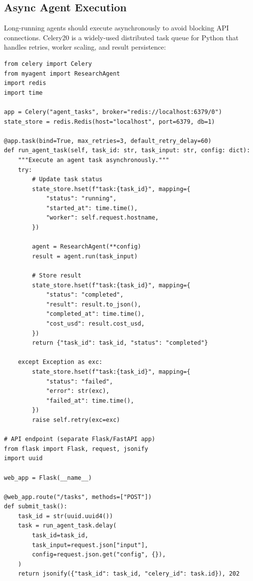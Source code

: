 \subsection{Async Agent Execution}
\label{async-agent-execution}

Long-running agents should execute asynchronously to avoid blocking API connections. Celery20 is a widely-used distributed task queue for Python that handles retries, worker scaling, and result persistence:

\begin{lstlisting}[style=pythonstyle, caption={Async agent execution with Celery}]
from celery import Celery
from myagent import ResearchAgent
import redis
import time

app = Celery("agent_tasks", broker="redis://localhost:6379/0")
state_store = redis.Redis(host="localhost", port=6379, db=1)

@app.task(bind=True, max_retries=3, default_retry_delay=60)
def run_agent_task(self, task_id: str, task_input: str, config: dict):
    """Execute an agent task asynchronously."""
    try:
        # Update task status
        state_store.hset(f"task:{task_id}", mapping={
            "status": "running",
            "started_at": time.time(),
            "worker": self.request.hostname,
        })

        agent = ResearchAgent(**config)
        result = agent.run(task_input)

        # Store result
        state_store.hset(f"task:{task_id}", mapping={
            "status": "completed",
            "result": result.to_json(),
            "completed_at": time.time(),
            "cost_usd": result.cost_usd,
        })
        return {"task_id": task_id, "status": "completed"}

    except Exception as exc:
        state_store.hset(f"task:{task_id}", mapping={
            "status": "failed",
            "error": str(exc),
            "failed_at": time.time(),
        })
        raise self.retry(exc=exc)

# API endpoint (separate Flask/FastAPI app)
from flask import Flask, request, jsonify
import uuid

web_app = Flask(__name__)

@web_app.route("/tasks", methods=["POST"])
def submit_task():
    task_id = str(uuid.uuid4())
    task = run_agent_task.delay(
        task_id=task_id,
        task_input=request.json["input"],
        config=request.json.get("config", {}),
    )
    return jsonify({"task_id": task_id, "celery_id": task.id}), 202
\end{lstlisting}

